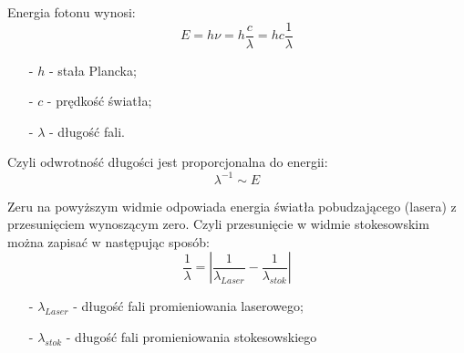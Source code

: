 Energia fotonu wynosi:
\begin{equation}
	E = h \nu = h \frac{c}{\lambda} = hc \frac{1}{\lambda} 
\end{equation}
\begin{itemize}
	\item[-]{$h$ - stała Plancka};
	\item[-]{$c$ - prędkość światła};
	\item[-]{$\lambda$ - długość fali}.
\end{itemize}
Czyli odwrotność długości jest proporcjonalna do energii:
\begin{equation}
	\lambda^{-1} \sim E
\end{equation}

Zeru na powyższym widmie odpowiada energia światła pobudzającego (lasera) z przesunięciem wynoszącym zero. Czyli przesunięcie w widmie stokesowskim można zapisać w następując sposób:
\begin{equation}
	\frac{1}{\lambda} = \left| \frac{1}{\lambda_{Laser}} - \frac{1}{\lambda_{stok}} \right|
\end{equation}
\begin{itemize}
	\item[-]{$\lambda_{Laser}$ - długość fali promieniowania laserowego};
	\item[-]{$\lambda_{stok}$ - długość fali promieniowania stokesowskiego}
\end{itemize}













